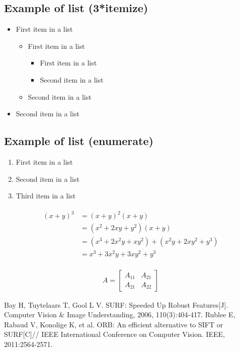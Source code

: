 \documentclass[paper=a4, fontsize=11pt]{scrartcl} %
\numberwithin{equation}{section} %
\numberwithin{figure}{section} %
\numberwithin{table}{section} %
\begin{document}
\subsection{Example of list (3*itemize)}
\begin{itemize}
	\item First item in a list 
		\begin{itemize}
		\item First item in a list 
			\begin{itemize}
			\item First item in a list 
			\item Second item in a list 
			\end{itemize}
		\item Second item in a list 
		\end{itemize}
	\item Second item in a list 
\end{itemize}


\subsection{Example of list (enumerate)}
\begin{enumerate}
\item First item in a list 
\item Second item in a list 
\item Third item in a list
\end{enumerate}


\begin{align} 
\begin{split}
(x+y)^3 	&= (x+y)^2(x+y)\\
&=(x^2+2xy+y^2)(x+y)\\
&=(x^3+2x^2y+xy^2) + (x^2y+2xy^2+y^3)\\
&=x^3+3x^2y+3xy^2+y^3
\end{split}					
\end{align}


\begin{align}
A = 
\begin{bmatrix}
A_{11} & A_{21} \\
A_{21} & A_{22}
\end{bmatrix}
\end{align}



\renewcommand\refname{Reference}

\begin{thebibliography}{99}
Bay H, Tuytelaars T, Gool L V. SURF: Speeded Up Robust Features[J]. Computer Vision \& Image Understanding, 2006, 110(3):404-417.
Rublee E, Rabaud V, Konolige K, et al. ORB: An efficient alternative to SIFT or SURF[C]// IEEE International Conference on Computer Vision. IEEE, 2011:2564-2571.
\end{thebibliography}
\end{document}
